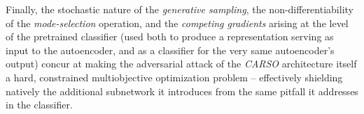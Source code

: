 Finally, the stochastic nature of the \textit{generative sampling}, the non-differentiability of the \textit{mode-selection} operation, and the \textit{competing gradients} arising at the level of the pretrained classifier (used both to produce a representation serving as input to the autoencoder, and as a classifier for the very same autoencoder’s output) concur at making the adversarial attack of the \textit{CARSO} architecture itself a hard, constrained multiobjective optimization problem – effectively shielding natively the additional subnetwork it introduces from the same pitfall it addresses in the classifier.